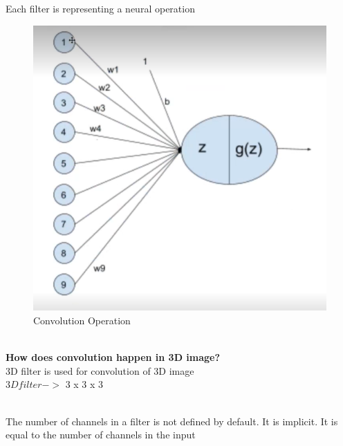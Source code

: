 \documentclass[11pt, twosides]{article}
\begin{document}
Each filter is representing a neural operation\\
\begin{figure}[H]
\centering
\caption{Convolution Operation}
\includegraphics[scale = 0.6]{419sc3.png}
\end{figure}
\\
\textbf{How does convolution happen in 3D image?}
\\ 
3D filter is used for convolution of 3D image\\

$3D filter -> $ 3 x 3 x 3 

\\
The number of channels in a filter is not defined by default. It is implicit. It is equal to the number of channels in the input
\newpage

\end{document}
